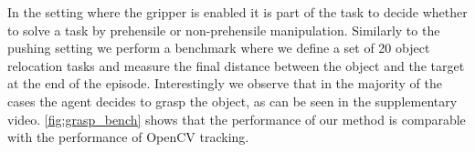 In the setting where the gripper is enabled it is part of the task to decide whether to solve a task by prehensile or non-prehensile manipulation. Similarly to the pushing setting we perform a benchmark where we define a set of 20 object relocation tasks and measure the final distance between the object and the target at the end of the episode. Interestingly we observe that in the majority of the cases the agent decides to grasp the object, as can be seen in the supplementary video. \autoref{fig:grasp_bench} shows that the performance of our method is comparable with the performance of OpenCV tracking.


